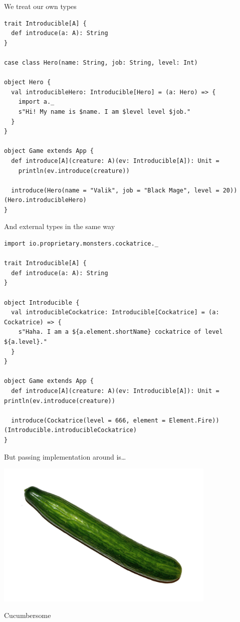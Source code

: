 \documentclass[presentation,aspectratio=169,smaller]{beamer}
\begin{document}
\begin{frame}[label={sec:org3e4729f},fragile]{We treat our own types}
 \begin{verbatim}
trait Introducible[A] {
  def introduce(a: A): String
}

case class Hero(name: String, job: String, level: Int)

object Hero {
  val introducibleHero: Introducible[Hero] = (a: Hero) => {
    import a._
    s"Hi! My name is $name. I am $level level $job."
  }
}

object Game extends App {
  def introduce[A](creature: A)(ev: Introducible[A]): Unit =
    println(ev.introduce(creature))

  introduce(Hero(name = "Valik", job = "Black Mage", level = 20))(Hero.introducibleHero)
}
\end{verbatim}
\end{frame}

\begin{frame}[label={sec:orgcfd1d85},fragile]{And external types in the same way}
 \begin{verbatim}
import io.proprietary.monsters.cockatrice._

trait Introducible[A] {
  def introduce(a: A): String
}

object Introducible {
  val introducibleCockatrice: Introducible[Cockatrice] = (a: Cockatrice) => {
    s"Haha. I am a ${a.element.shortName} cockatrice of level ${a.level}."
  }
}

object Game extends App {
  def introduce[A](creature: A)(ev: Introducible[A]): Unit = println(ev.introduce(creature))

  introduce(Cockatrice(level = 666, element = Element.Fire))(Introducible.introducibleCockatrice)
}
\end{verbatim}
\end{frame}

\begin{frame}[label={sec:org8dc371d}]{But passing implementation around is\ldots{}}
\begin{center}
\includegraphics[height=7cm]{images/cucumber.jpg}
\end{center}

Cucumbersome
\end{frame}
\end{document}
